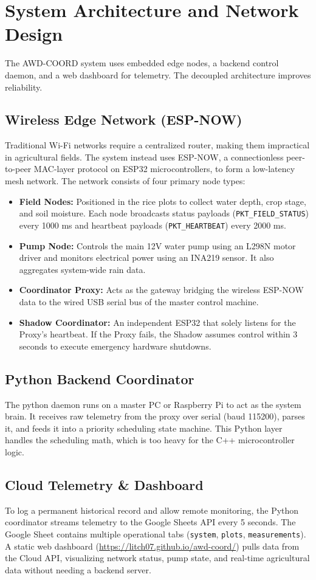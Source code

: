 \documentclass[conference]{IEEEtran}
\begin{document}
\section{System Architecture and Network Design}
The AWD-COORD system uses embedded edge nodes, a backend control daemon, and a web dashboard for telemetry. The decoupled architecture improves reliability.

\subsection{Wireless Edge Network (ESP-NOW)}
Traditional Wi-Fi networks require a centralized router, making them impractical in agricultural fields. The system instead uses ESP-NOW, a connectionless peer-to-peer MAC-layer protocol on ESP32 microcontrollers, to form a low-latency mesh network. 
The network consists of four primary node types:
\begin{itemize}
    \item \textbf{Field Nodes:} Positioned in the rice plots to collect water depth, crop stage, and soil moisture. Each node broadcasts status payloads (\texttt{PKT\_FIELD\_STATUS}) every 1000 ms and heartbeat payloads (\texttt{PKT\_HEARTBEAT}) every 2000 ms.
    \item \textbf{Pump Node:} Controls the main 12V water pump using an L298N motor driver and monitors electrical power using an INA219 sensor. It also aggregates system-wide rain data.
    \item \textbf{Coordinator Proxy:} Acts as the gateway bridging the wireless ESP-NOW data to the wired USB serial bus of the master control machine.
    \item \textbf{Shadow Coordinator:} An independent ESP32 that solely listens for the Proxy's heartbeat. If the Proxy fails, the Shadow assumes control within 3 seconds to execute emergency hardware shutdowns.
\end{itemize}

\subsection{Python Backend Coordinator}
The python daemon runs on a master PC or Raspberry Pi to act as the system brain. It receives raw telemetry from the proxy over serial (baud 115200), parses it, and feeds it into a priority scheduling state machine. This Python layer handles the scheduling math, which is too heavy for the C++ microcontroller logic.

\subsection{Cloud Telemetry \& Dashboard}
To log a permanent historical record and allow remote monitoring, the Python coordinator streams telemetry to the Google Sheets API every 5 seconds. The Google Sheet contains multiple operational tabs (\texttt{system}, \texttt{plots}, \texttt{measurements}). A static web dashboard (\url{https://litch07.github.io/awd-coord/}) pulls data from the Cloud API, visualizing network status, pump state, and real-time agricultural data without needing a backend server.
\end{document}

